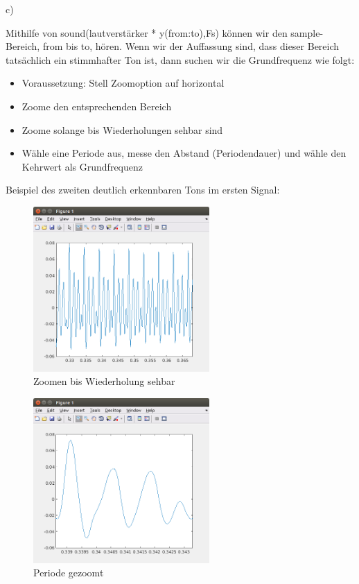 c) 

Mithilfe von sound(lautverstärker * y(from:to),Fs) können wir den
sample-Bereich, from bis to, hören. Wenn wir der Auffassung sind, dass dieser
Bereich tatsächlich ein stimmhafter Ton ist, dann suchen wir die Grundfrequenz
wie folgt: 
\begin{itemize}
	\item Voraussetzung: Stell Zoomoption auf horizontal
	\item Zoome den entsprechenden Bereich 
	\item Zoome solange bis Wiederholungen sehbar sind
	\item Wähle eine Periode aus, messe den Abstand (Periodendauer)
	und wähle den Kehrwert als Grundfrequenz
\end{itemize}

Beispiel des zweiten deutlich erkennbaren Tons im ersten Signal:

\begin{figure}[H]
	\centering
	\includegraphics[width=0.6\textwidth]{./bilder/grundfrequenzsuche.png}
	\caption{Zoomen bis Wiederholung sehbar}
	\label{img:grundfrequenzsuche}
\end{figure}

\begin{figure}[H]
	\centering
	\includegraphics[width=0.6\textwidth]{./bilder/periode.png}
	\caption{Periode gezoomt}
	\label{img:periode}
\end{figure}

